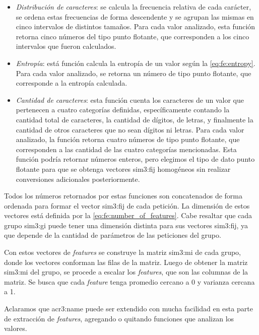 \begin{itemize}
    \item
    \textit{Distribución de caracteres}:
    se calcula la frecuencia relativa de cada carácter, se ordena estas
    frecuencias de forma descendente y se agrupan las mismas en cinco
    intervalos de distintos tamaños.
    Para cada valor analizado, esta función retorna cinco números del
    tipo punto flotante, que corresponden a los cinco intervalos que
    fueron calculados.

    \item
    \textit{Entropía}:
    está función calcula la entropía de un valor según la
    \autoref{eq:fe:entropy}.
    Para cada valor analizado, se retorna un número de tipo punto flotante,
    que corresponde a la entropía calculada.

    \item
    \textit{Cantidad de caracteres}:
    esta función cuenta los caracteres de un valor que pertenecen a
    cuatro categorías definidas, específicamente contando la cantidad
    total de caracteres, la cantidad de dígitos, de letras, y finalmente
    la cantidad de otros caracteres que no sean dígitos ni letras.
    Para cada valor analizado, la función retorna cuatro números de
    tipo punto flotante, que corresponden a las cantidad de las cuatro
    categorías mencionadas.
    Esta función podría retornar números enteros, pero elegimos el tipo
    de dato punto flotante para que se obtenga vectores \gls{sim3:fij}
    homogéneos sin realizar conversiones adicionales posteriormente.
\end{itemize}

Todos los números retornados por estas funciones son concatenados de forma
ordenada para formar el vector \gls{sim3:fij} de cada petición. La dimensión
de estos vectores está definida por la \autoref{eq:fe:number_of_features}.
Cabe resaltar que cada grupo \gls{sim3:gi} puede tener una dimensión
distinta para sus vectores \gls{sim3:fij}, ya que depende de la cantidad
de parámetros de las peticiones del grupo.

Con estos vectores de \textit{features} se construye la matriz \gls{sim3:mi}
de cada grupo, donde los vectores conforman las filas de la matriz.
Luego de obtener la matriz \gls{sim3:mi} del grupo, se procede a escalar
los \textit{features}, que son las columnas de la matriz. Se busca que
cada \textit{feature} tenga promedio cercano a 0 y varianza cercana a 1.

Aclaramos que \gls{acr3:name} puede ser extendido con mucha facilidad
en esta parte de extracción de \textit{features}, agregando o quitando
funciones que analizan los valores.


